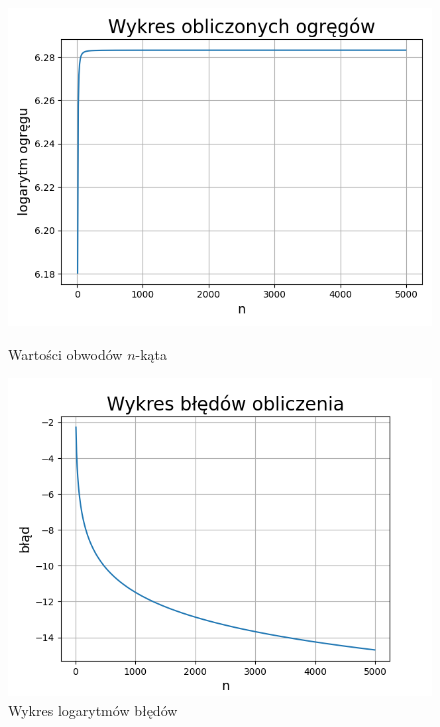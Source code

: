 \documentclass[12pt,a4paper]{article}
\begin{document}
\begin{figure}[!htb]
    \centering

    \begin{minipage}{.45\textwidth}
        \centering
        \includegraphics[width=\linewidth]{images/h1.png}
        \caption{Wartości obwodów $n$-kąta}
        \label{fig:h1}
    \end{minipage}\hfill
    \begin{minipage}{.45\textwidth}
        \centering
        \includegraphics[width=\linewidth]{images/h1_blad.png}
        \caption{Wykres logarytmów błędów}
        \label{fig:h1_blad}
    \end{minipage}
\end{figure}
\end{document}
